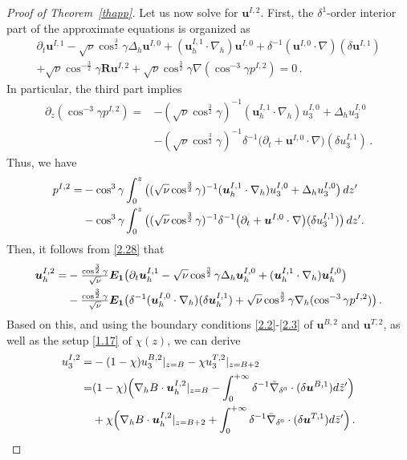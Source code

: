 \documentclass[pdflatex,sn-mathphys-num]{sn-jnl}%
\theoremstyle{thmstyleone}%
\theoremstyle{thmstyletwo}%
\theoremstyle{thmstylethree}%
\theoremstyle{thmstyletwo}
\begin{document}
\begin{proof}[Proof of Theorem~{\upshape\ref{thapp}}]
Let us now solve for $\boldsymbol{u}^{I,2}$. First, the $\delta^1$-order interior part of the approximate equations is organized as
\begin{multline}\label{2.28}
	\partial_{t} \boldsymbol{u}^{I,1}
	-\sqrt{\nu}\cos^{\frac{3}{2}}\gamma\Delta_h\boldsymbol{u}^{I,0}
	+(\boldsymbol{u}_h^{I,1}\cdot\nabla_{ h})\boldsymbol{u}^{I,0}
	+	\delta^{-1}(\boldsymbol{u}^{I,0}\cdot\nabla)(\delta\boldsymbol{u}^{I,1})\\
	+\sqrt{\nu}\cos^{-\frac{3}{2}}\gamma\boldsymbol{R}\boldsymbol{u}^{I,2}
	+\sqrt{\nu}\cos^{\frac{3}{2}}\gamma\nabla(\cos^{-3}\gamma p^{I,2})
	=0\,.
\end{multline} 
In particular, the third part implies 
\begin{align*}
	\partial_z(\cos^{-3}\gamma p^{I,2})
	=&-(\sqrt{\nu}\cos^{\frac{3}{2}}\gamma)^{-1}
	(\boldsymbol{u}_h^{I,1}\cdot\nabla_{ h}){u}^{I,0}_3
	+\Delta_h{u}^{I,0}_3\\
	&-(\sqrt{\nu}\cos^{\frac{3}{2}}\gamma)^{-1}\delta^{-1}
	\big(
	\partial_{t}	+\boldsymbol{u}^{I,0}\cdot\nabla\big)(\delta{u}_3^{I,1})\,.
\end{align*}
Thus, we have
\begin{align}\label{2.29}
	p^{I,2}
	=&-\cos^3\gamma
	\int_0^z\big((\sqrt{\nu}\cos^{\frac{3}{2}}\gamma)^{-1}
	(\boldsymbol{u}_h^{I,1}\cdot\nabla_{ h}){u}^{I,0}_3
	+\Delta_h{u}^{I,0}_3\big)\,dz'
	\notag\\
	&-\cos^3\gamma
	\int_0^z\big(
	(\sqrt{\nu}\cos^{\frac{3}{2}}\gamma)^{-1}\delta^{-1}
	\big(
	\partial_{t}	+\boldsymbol{u}^{I,0}\cdot\nabla\big)(\delta{u}_3^{I,1})
	\big)\,dz'.
\end{align}
Then, it follows from \eqref{2.28} that
\begin{align}\label{2.30}
	\boldsymbol{u}_h^{I,2}
	=&-\tfrac{\cos^{\frac{3}{2}}\gamma}{\sqrt{\nu}}\boldsymbol{E_1}\big(
	\partial_{t} \boldsymbol{u}_h^{I,1}
	-\sqrt{\nu}\cos^{\frac{3}{2}}\gamma\Delta_h\boldsymbol{u}^{I,0}_h
	+(\boldsymbol{u}_h^{I,1}\cdot\nabla_{ h})\boldsymbol{u}^{I,0}_h\big)\notag\\
	&-\tfrac{\cos^{\frac{3}{2}}\gamma}{\sqrt{\nu}}\boldsymbol{E_1}\big(	\delta^{-1}(\boldsymbol{u}_h^{I,0}\cdot\nabla_h)(\delta\boldsymbol{u}_h^{I,1})	
	+\sqrt{\nu}\cos^{\frac{3}{2}}\gamma\nabla_h(\cos^{-3}\gamma p^{I,2})
	\big)\,.
\end{align} 
Based on this, and using the boundary conditions \eqref{2.2}-\eqref{2.3} of $\boldsymbol{u}^{B,2}$ and $\boldsymbol{u}^{T,2}$, as well as the setup \eqref{1.17} of $\chi(z)$, we can derive
\begin{align}\label{2.31}
	u_3^{I,2}
	=&-(1-\chi)	u_3^{B,2}|_{z=B}-\chi	u_3^{T,2}|_{z=B+2}\notag\\
	=&(1-\chi)\Big(
	\nabla_hB\cdot\boldsymbol{u}_h^{I,2}|_{z=B}
	-\int_{0}^{+\infty}
	\delta^{-1}\tilde{\nabla}_{\delta^0}
	\cdot(\delta\boldsymbol{u}^{B,1})
	d\tilde{z}'
	\Big)\notag\\
	&+\chi\Big(
	\nabla_hB\cdot\boldsymbol{u}_h^{I,2}|_{z=B+2}
	+\int_{0}^{+\infty}
	\delta^{-1}\bar{\nabla}_{\delta^0}
	\cdot(\delta\boldsymbol{u}^{T,1})
	d\bar{z}'
	\Big)\,.
\end{align}





\end{proof}
\end{document}
